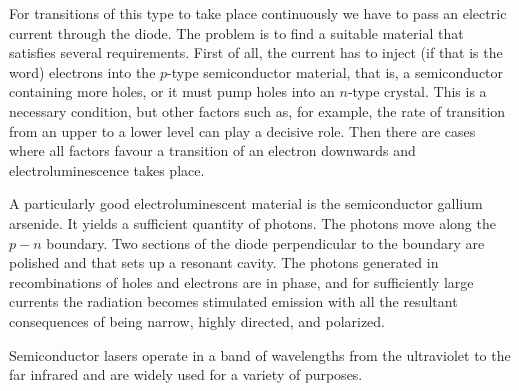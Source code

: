 For transitions of this type to take place continuously we have to pass an electric current through the diode. The problem is to find a suitable material that satisfies several requirements. First of all, the current has to inject (if that is the word) electrons into the $p$-type semiconductor material, that is, a semiconductor containing more holes, or it must pump holes into an $n$-type crystal. This is a necessary condition, but other factors such as, for example, the rate of transition from an upper to a lower level can play a decisive role. Then there are cases where all factors favour a transition of an electron downwards and electroluminescence takes place.

A particularly good electroluminescent material is the semiconductor gallium arsenide. It yields a sufficient quantity of photons. The photons move along the $p\!-\!n$ boundary. Two sections of the diode perpendicular to the boundary are polished and that sets up a resonant cavity. The photons generated in recombinations of holes and electrons are in phase, and for sufficiently large currents the radiation becomes stimulated emission with all the resultant consequences of being narrow, highly directed, and polarized.

Semiconductor lasers operate in a band of wavelengths from the ultraviolet to the far infrared and are widely used for a variety of purposes.





